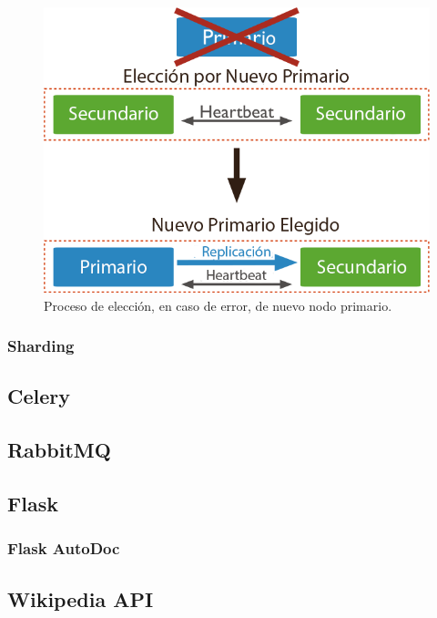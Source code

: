 \begin{figure}[H]
	\centering
		\includegraphics[width=.6\textwidth]{figures/failover}
	\caption{Proceso de elección, en caso de error, de nuevo nodo primario.}
	\label{fig:failover}
\end{figure}


\subsubsection{Sharding}


\subsection{Celery}

\subsection{RabbitMQ}

\subsection{Flask}

\subsubsection{Flask AutoDoc}

\subsection{Wikipedia API}

